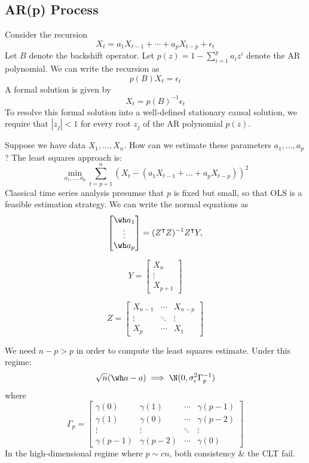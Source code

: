 \subsection*{AR(p) Process}
Consider the recursion
\[X_t = a_1 X_{t-1} + \cdots + a_p X_{t-p} + \epsilon_t\]
Let \(B\) denote the backshift operator. Let \(p(z) = 1 - \sum_{i=1}^p a_i z^i\) denote the AR polynomial. We can write the recursion as
\[p(B)X_t = \epsilon_t\]
A formal solution is given by
\[X_t = p(B)^{-1} \epsilon_t\]
To resolve this formal solution into a well-defined stationary causal solution, we require that \(|z_j| < 1\) for every root \(z_j\) of the AR polynomial \(p(z)\).

Suppose we have data \(X_1, \dots, X_n\). How can we estimate these parameters \(a_1, \dots, a_p\)? The least squares approach is:
\[\min_{a_1, \dots, a_p} \sum_{t=p+1}^n (X_t - (a_1 X_{t-1} + \dots + a_p X_{t-p}))^2\]
Classical time series analysis presumse that \(p\) is fixed but small, so that OLS is a feasible estimation strategy. We can write the normal equations as
\[\begin{bmatrix}
\wh a_1 \\
\vdots \\
\wh a_p
\end{bmatrix}
= (Z^\intercal Z)^{-1} Z^\intercal Y,\]

\[Y = 
\begin{bmatrix}
X_n \\
\vdots \\
X_{p+1}
\end{bmatrix}\]

\[Z =
\begin{bmatrix}
X_{n-1} & \cdots & X_{n-p} \\
\vdots & \ddots & \vdots \\
X_p & \cdots & X_1
\end{bmatrix}\]

We need \(n - p > p\) in order to compute the least squares estimate. Under this regime:
\[\sqrt{n}(\wh a - a) \implies   \N(0, \sigma^2_\epsilon \Gamma_p^{-1})\]
where
\[\Gamma_p =
\begin{bmatrix}
\gamma(0) & \gamma(1) & \cdots & \gamma(p - 1) \\
\gamma(1) & \gamma(0) & \cdots & \gamma(p - 2) \\
\vdots & \vdots & \ddots & \vdots \\
\gamma(p - 1) & \gamma(p - 2) &  \cdots & \gamma(0)
\end{bmatrix}\]
In the high-dimensional regime where \(p \sim cn\), both consistency \& the CLT fail.

